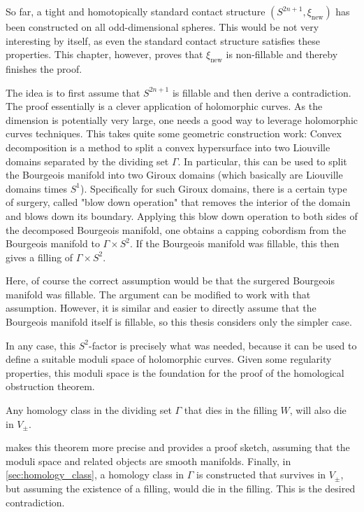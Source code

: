 So far, a tight and homotopically standard contact structure $(S^{2n+1}, \xi_\text{new})$ has been constructed on all odd-dimensional spheres.
This would be not very interesting by itself, as even the standard contact structure satisfies these properties.
This chapter, however, proves that $\xi_\text{new}$ is non-fillable and thereby finishes the proof.

The idea is to first assume that $S^{2n+1}$ is fillable and then derive a contradiction.
The proof essentially is a clever application of holomorphic curves.
As the dimension is potentially very large, one needs a good way to leverage holomorphic curves techniques.
This takes quite some geometric construction work: 
Convex decomposition is a method to split a convex hypersurface into two Liouville domains separated by the dividing set $\Gamma$.
In particular, this can be used to split the Bourgeois manifold into two Giroux domains (which basically are Liouville domains times $S^1$).
Specifically for such Giroux domains, there is a certain type of surgery, called "blow down operation" that removes the
interior of the domain and blows down its boundary.
Applying this blow down operation to both sides of the decomposed Bourgeois manifold, one obtains a
capping cobordism from the Bourgeois manifold to $\Gamma \times S^2$. 
If the Bourgeois manifold was fillable, this then gives a filling of $\Gamma \times S^2$.

Here, of course the correct assumption would be that the surgered Bourgeois manifold was fillable. 
The argument can be modified to work with that assumption. However, it is similar and easier to
directly assume that the Bourgeois manifold itself is fillable, so this thesis considers only the simpler case.

In any case, this $S^2$-factor is precisely what was needed, 
because it can be used to define a suitable moduli space of holomorphic curves. 
Given some regularity properties, this moduli space is the foundation for the proof of the homological obstruction theorem.
\begin{theorem}
    Any homology class in the dividing set $\Gamma$ that dies in the filling $W$, will also die in $V_\pm$.
\end{theorem}
 makes this theorem more precise and provides a proof sketch, assuming that the moduli space and
related objects are smooth manifolds.
Finally, in \cref{sec:homology_class}, a homology class in $\Gamma$ is constructed that survives in $V_\pm$, but assuming
the existence of a filling, would die in the filling. This is the desired contradiction. 